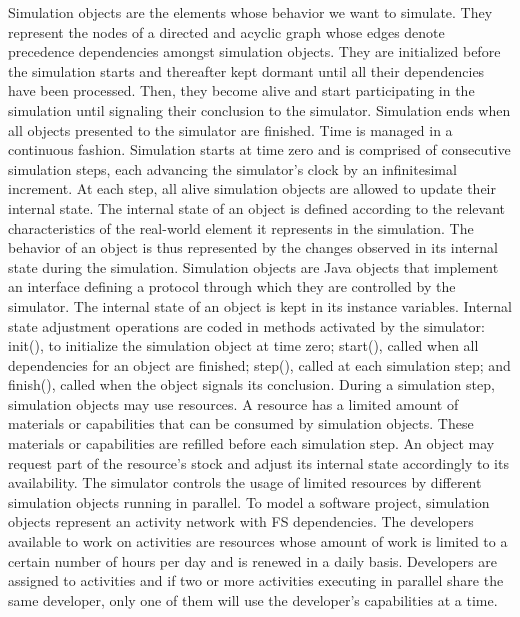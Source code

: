 \documentclass[conference]{IEEEtran}
\begin{document}
Simulation objects are the elements whose behavior we want to simulate. They represent the nodes of a directed and acyclic graph whose edges denote precedence dependencies amongst simulation objects. They are initialized before the simulation starts and thereafter kept dormant until all their dependencies have been processed. Then, they become alive and start participating in the simulation until signaling their conclusion to the simulator. Simulation ends when all objects presented to the simulator are finished.
Time is managed in a continuous fashion. Simulation starts at time zero and is comprised of consecutive simulation steps, each advancing the simulator's clock by an infinitesimal increment. At each step, all alive simulation objects are allowed to update their internal state. The internal state of an object is defined according to the relevant characteristics of the real-world element it represents in the simulation. The behavior of an object is thus represented by the changes observed in its internal state during the simulation.
Simulation objects are Java objects that implement an interface defining a protocol through which they are controlled by the simulator. The internal state of an object is kept in its instance variables. Internal state adjustment operations are coded in methods activated by the simulator: init(), to initialize the simulation object at time zero; start(), called when all dependencies for an object are finished; step(), called at each simulation step; and finish(), called when the object signals its conclusion.
During a simulation step, simulation objects may use resources. A resource has a limited amount of materials or capabilities that can be consumed by simulation objects. These materials or capabilities are refilled before each simulation step. An object may request part of the resource's stock and adjust its internal state accordingly to its availability. The simulator controls the usage of limited resources by different simulation objects running in parallel. To model a software project, simulation objects represent an activity network with FS dependencies. The developers available to work on activities are resources whose amount of work is limited to a certain number of hours per day and is renewed in a daily basis. Developers are assigned to activities and if two or more activities executing in parallel share the same developer, only one of them will use the developer's capabilities at a time.
\end{document}
